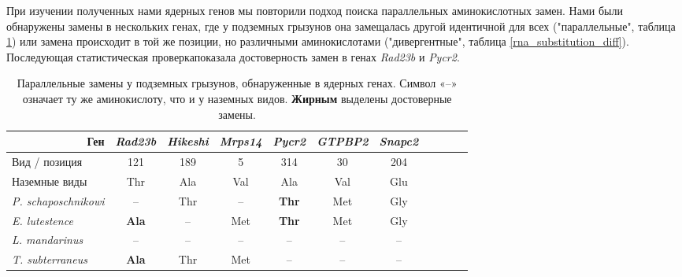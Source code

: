 При изучении полученных нами ядерных генов мы повторили подход поиска параллельных аминокислотных замен. Нами были обнаружены замены в нескольких генах, где у подземных грызунов она замещалась другой идентичной для всех ("параллельные", таблица \ref{rna_substitution_all}) или замена происходит в той же позиции, но различными аминокислотами ("дивергентные", таблица \ref{rna_substitution_diff}). Последующая статистическая проверкапоказала достоверность замен в генах \textit{Rad23b} и \textit{Pycr2}. 

\begin{table}[h!]
	\caption{Параллельные замены у подземных грызунов, обнаруженные в ядерных генах. Символ «--» означает ту же аминокислоту, что и у наземных видов. \textbf{Жирным} выделены достоверные замены. }\label{rna_substitution_all} \vspace{5mm}
	
	\begin{center}
	\begin{tabular}{|l|c|c|c|c|c|c|c|c|c|c}
		\hline
		\multicolumn{1}{|r|}{Ген} & \textit{Rad23b} & \textit{Hikeshi} & \textit{Mrps14} & \textit{Pycr2} & \textit{GTPBP2} & \textit{Snapc2} \\ \hline
		Вид   / позиция & 121 & 189 & 5 & 314 & 30 & 204  \\ \hline
		Наземные виды &  Thr & Ala & Val & Ala & Val & Glu  \\ \hline
		\textit{P. schaposchnikowi}  & -- & Thr & -- & \textbf{Thr}  & Met & Gly  \\ \hline
		\textit{E. lutestence}  & \textbf{Ala} & -- & Met & \textbf{Thr} & Met & Gly  \\ \hline
		\textit{L. mandarinus}  & -- & -- & -- & --  & -- & --  \\ \hline
		\textit{T. subterraneus} & \textbf{Ala} & Thr  & Met & -- & -- & -- \\ \hline
	\end{tabular}
\end{center}
\end{table}


